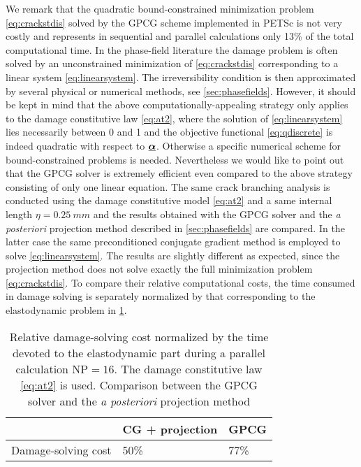 We remark that the quadratic bound-constrained minimization problem \eqref{eq:crackstdis} solved by the GPCG scheme implemented in PETSc is not very costly and represents in sequential and parallel calculations only 13\% of the total computational time. In the phase-field literature the damage problem is often solved by an unconstrained minimization of \eqref{eq:crackstdis} corresponding to a linear system \eqref{eq:linearsystem}. The irreversibility condition is then approximated by several physical or numerical methods, see \cref{sec:phasefields}. However, it should be kept in mind that the above computationally-appealing strategy only applies to the damage constitutive law \eqref{eq:at2}, where the solution of \eqref{eq:linearsystem} lies necessarily between 0 and 1 and the objective functional \eqref{eq:qdiscrete} is indeed quadratic with respect to $\dvec$. Otherwise a specific numerical scheme for bound-constrained problems is needed. Nevertheless we would like to point out that the GPCG solver is extremely efficient even compared to the above strategy consisting of only one linear equation. The same crack branching analysis is conducted using the damage constitutive model \eqref{eq:at2} and a same internal length $\eta=\SI{0.25}{mm}$ and the results obtained with the GPCG solver and the \emph{a posteriori} projection method described in \cref{sec:phasefields} are compared. In the latter case the same preconditioned conjugate gradient method is employed to solve \eqref{eq:linearsystem}. The results are slightly different as expected, since the projection method does not solve exactly the full minimization problem \eqref{eq:crackstdis}. To compare their relative computational costs, the time consumed in damage solving is separately normalized by that corresponding to the elastodynamic problem in \cref{tab:gpcg_vs_cg_proj}.
\begin{table}[htbp]
\centering
\caption{Relative damage-solving cost normalized by the time devoted to the elastodynamic part during a parallel calculation $\mathrm{NP}=16$. The damage constitutive law \eqref{eq:at2} is used. Comparison between the GPCG solver and the \emph{a posteriori} projection method} \label{tab:gpcg_vs_cg_proj}
\begin{tabular}{lll} \toprule
&  CG + projection & GPCG \\ \midrule
Damage-solving cost & 50\% & 77\% \\ \bottomrule
\end{tabular}
\end{table}

